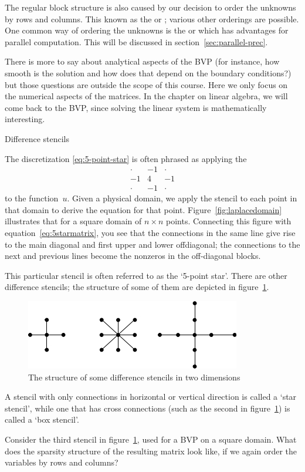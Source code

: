 The regular block structure is also caused by our decision to order
the unknowns by rows and columns. This known as the  or ; various other orderings are
possible. One common way of ordering the unknowns is the
 or  which has advantages for parallel computation. This will
be discussed in section~\ref{sec:parallel-prec}.

There is more to say about analytical aspects of the \ac{BVP} (for
instance, how smooth is the solution and how does that depend on the
boundary conditions?) but those questions are outside the scope of
this course. Here we only focus on the numerical aspects of the
matrices. In the  chapter on linear algebra, we will come back to the
\ac{BVP}, since solving the linear system is mathematically interesting.

 {Difference stencils}

The discretization \eqref{eq:5-point-star} is often phrased as
applying the 
\[
\begin{matrix}
  \cdot&-1&\cdot\\ -1&4&-1\\ \cdot&-1&\cdot
\end{matrix}
\]
to the function~$u$. Given a physical domain, we apply the stencil to
each point in that domain to derive the equation for that
point. Figure~\ref{fig:laplacedomain} illustrates that for a square domain
of $n\times n$ points.
Connecting this figure with equation~\eqref{eq:5starmatrix}, you
see that the connections in the same line give rise to the main
diagonal and first upper and lower offdiagonal; the connections to the
next and previous lines become the nonzeros in the off-diagonal
blocks.

This particular stencil is often referred to as
the `5-point star'. There are other difference stencils; the structure
of some of them are depicted in figure~\ref{fig:stencils}.
\begin{figure}[ht]
  \centering
  \includegraphics[scale=.8]{graphics/stencils}
  \caption{The structure of some difference stencils in two dimensions}
  \label{fig:stencils}
\end{figure}
A stencil with only connections in horizontal or vertical direction is
called a `star stencil', while one that has cross connections (such as
the second in figure~\ref{fig:stencils}) is called a `box
stencil'. 
\begin{exercise}
  Consider the third stencil in figure~\ref{fig:stencils}, used for a
  \ac{BVP} on a square domain.
  What does the sparsity structure of the resulting matrix look like,
  if we again order the variables by rows and columns?
\end{exercise}

